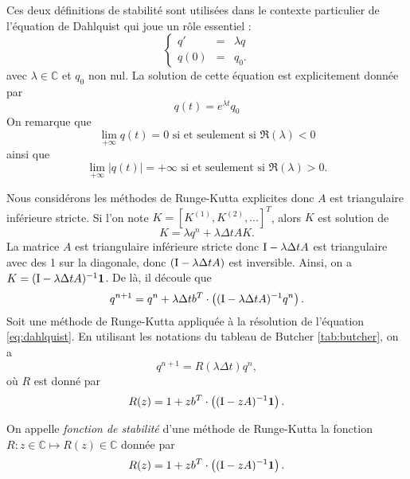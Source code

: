 Ces deux définitions de stabilité sont utilisées dans le contexte particulier de l'équation de Dahlquist qui joue un rôle essentiel :
\begin{equation}
\left\lbrace 
\begin{array}{rcl}
q' & = & \lambda q \\
q(0) & = & q_0.
\end{array}
\right.
\label{eq:dahlquist}
\end{equation}
avec $\lambda \in \mathbb{C}$ et $q_0$ non nul. La solution de cette équation est explicitement donnée par 
\begin{equation}
q(t) = e^{\lambda t} q_0
\end{equation}
On remarque que
\begin{equation}
\lim_{+ \infty} q(t) = 0 \text{ si et seulement si } \Re(\lambda) < 0
\end{equation}
ainsi que
\begin{equation}
\lim_{+ \infty} |q(t)| = + \infty \text{ si et seulement si } \Re(\lambda)>0.
\end{equation}

Nous considérons les méthodes de Runge-Kutta explicites donc $A$ est triangulaire inférieure stricte.
Si l'on note $K = [K^{(1)}, K^{(2)}, ...]^T$, alors $K$ est solution de 
\begin{equation}
K = \lambda q^n +  \lambda \Delta t A K.
\end{equation}
La matrice $A$ est triangulaire inférieure stricte donc $\text{I} - \lambda \Delta t A$ est triangulaire avec des 1 sur la diagonale, donc $(\text{I} - \lambda \Delta t A)$ est inversible.
Ainsi, on a $K = (\text{I} - \lambda \Delta t A)^{-1} \mathbf{1}$.
De là, il découle que 
\begin{equation}
q^{n+1} = q^n + \lambda \Delta t b^T \cdot \left( (\text{I} - \lambda \Delta t A)^{-1} q^n \right).
\end{equation} 
Soit une méthode de Runge-Kutta appliquée à la résolution de l'équation \eqref{eq:dahlquist}. En utilisant les notations du tableau de Butcher \ref{tab:butcher}, on a 
\begin{equation}
q^{n+1} = R(\lambda \Delta t) q^n,
\end{equation}
où $R$ est donné par
\begin{equation}
R(z) = 1 + z b^T \cdot \left( (\text{I} - z A)^{-1} \mathbf{1} \right).
\end{equation}
\begin{definition}

On appelle \textit{fonction de stabilité} d'une méthode de Runge-Kutta la fonction $R : z \in \mathbb{C} \mapsto R(z) \in \mathbb{C}$ donnée par 
\begin{equation}
R(z) = 1 + z b^T \cdot \left( (\text{I} - z A)^{-1} \mathbf{1} \right).
\end{equation}
\end{definition}


